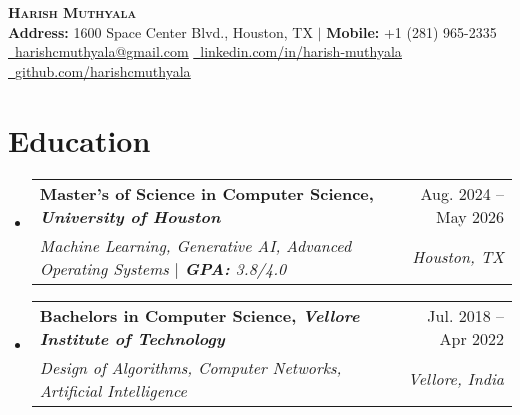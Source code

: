 \documentclass[letterpaper,11pt]{article}
\makeatletter
\newcommand{\resumeSubheading}[4]{
  \vspace{-2pt}\item
    \begin{tabular*}{0.97\textwidth}[t]{l@{\extracolsep{\fill}}r}
      \textbf{#1} & #2 \\
      \textit{\small#3} & \textit{\small #4} \\
    \end{tabular*}\vspace{-7pt}
}
\newcommand{\resumeSubHeadingListStart}{\begin{itemize}[leftmargin=0.15in, label={}]}
\newcommand{\resumeSubHeadingListEnd}{\end{itemize}}
\makeatother
\begin{document}

\begin{center}
    \textbf{\Huge \scshape Harish Muthyala} \\
    {\small
        \vspace{6pt}
        \textbf{Address:} 1600 Space Center Blvd., Houston, TX $|$ \textbf{Mobile:} +1 (281) 965-2335 \\
        \vspace{3pt}
        \href{mailto:harishcmuthyala@gmail.com}{\faEnvelope~\underline{harishcmuthyala@gmail.com}} \hspace{1em}
        \href{https://linkedin.com/in/harish-muthyala}{\faLinkedinSquare~\underline{linkedin.com/in/harish-muthyala}} \hspace{1em}
        \href{https://github.com/harishcmuthyala}{\faGithub~\underline{github.com/harishcmuthyala}}
    }
\end{center}





\section{Education}
\resumeSubHeadingListStart
  \resumeSubheading
    {Master's of Science in Computer Science, \textmd{\textit{University of Houston}}}{Aug. 2024 -- May 2026}
    {Machine Learning, Generative AI, Advanced Operating Systems $|$ \textbf{GPA: }3.8/4.0}{Houston, TX}

  \resumeSubheading
    {Bachelors in Computer Science, \textmd{\textit{Vellore Institute of Technology}}}{Jul. 2018 -- Apr 2022}
    {Design of Algorithms, Computer Networks, Artificial Intelligence}{Vellore, India}
\resumeSubHeadingListEnd


%
\end{document}
